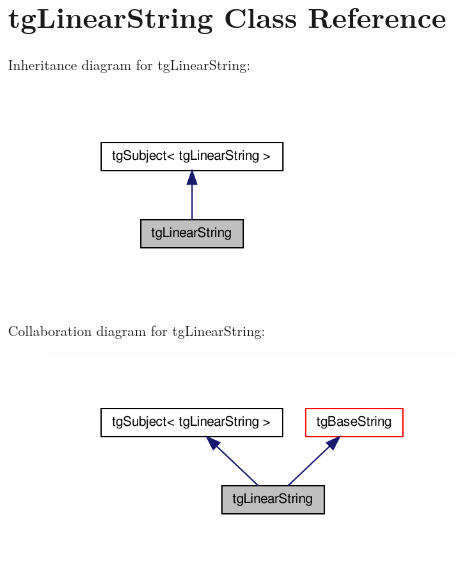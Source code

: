 \hypertarget{classtg_linear_string}{\section{tg\-Linear\-String Class Reference}
\label{classtg_linear_string}
}


Inheritance diagram for tg\-Linear\-String\-:\nopagebreak
\begin{figure}[H]
\begin{center}
\leavevmode
\includegraphics[width=216pt]{classtg_linear_string__inherit__graph}
\end{center}
\end{figure}


Collaboration diagram for tg\-Linear\-String\-:\nopagebreak
\begin{figure}[H]
\begin{center}
\leavevmode
\includegraphics[width=306pt]{classtg_linear_string__coll__graph}
\end{center}
\end{figure}
